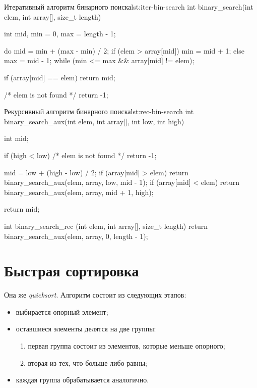 \begin{clst}{Итеративный алгоритм бинарного поиска}{lst:iter-bin-search}
int binary_search(int elem, int array[], size_t length)
{
    int mid, min = 0, max = length - 1;

    do {
        mid = min + (max - min) / 2;
        if (elem > array[mid])
            min = mid + 1;
        else
            max = mid - 1;
    } while (min <= max && array[mid] != elem);

    if (array[mid] == elem)
        return mid;

    /* elem is not found */
    return -1;
}
\end{clst}

\begin{clst}{Рекурсивный алгоритм бинарного поиска}{lst:rec-bin-search}
int binary_search_aux(int elem, int array[], int low, int high)
{
    int mid;

    if (high < low)
        /* elem is not found */
        return -1;

    mid = low + (high - low) / 2;
    if (array[mid] > elem)
        return binary_search_aux(elem, array, low, mid - 1);
    if (array[mid] < elem)
        return binary_search_aux(elem, array, mid + 1, high);

    return mid;
}

int binary_search_rec (int elem, int array[], size_t length)
{
    return binary_search_aux(elem, array, 0, length - 1);
}
\end{clst}

\section{Быстрая сортировка}
\label{sec:qsort}

Она же \emph{quicksort}. Алгоритм состоит из следующих этапов:
\begin{itemize}
  \item выбирается опорный элемент;
  \item оставшиеся элементы делятся на две группы:
    \begin{enumerate}
      \item первая группа состоит из элементов, которые меньше опорного;
      \item вторая из тех, что больше либо равны;
    \end{enumerate}
  \item каждая группа обрабатывается аналогично.
\end{itemize}

